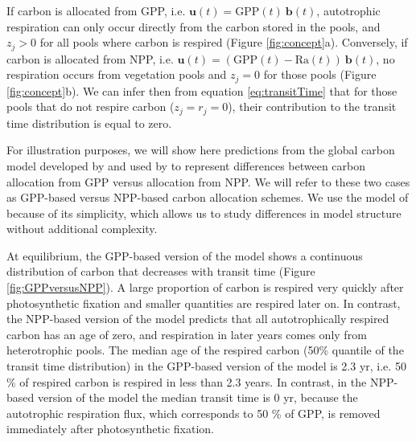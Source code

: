 \documentclass[bg, manuscript]{copernicus}
\begin{document}
 If carbon is allocated from GPP, i.e. $\bm{u}(t) = \mathrm{GPP}(t) \ \bm{b}(t) $, autotrophic respiration can only occur directly from the carbon stored in the pools, and $z_j > 0$ for all pools where carbon is respired (Figure \ref{fig:concept}a). Conversely, if carbon is allocated from NPP, i.e. $\bm{u}(t) = (\mathrm{GPP}(t) - \mathrm{Ra}(t)) \ \bm{b}(t)$, no respiration occurs from vegetation pools and $z_j = 0$ for those pools (Figure \ref{fig:concept}b). We can infer then from equation \eqref{eq:transitTime} that for those pools that do not respire carbon ($z_j = r_j = 0$), their contribution to the transit time distribution is equal to zero.

For illustration purposes, we will show here predictions from the global carbon model developed by \citet{Emanuel1981} and used by \citet{Thompson1999} to represent differences between carbon allocation from GPP versus allocation from NPP. We will refer to these two cases as GPP-based versus NPP-based carbon allocation schemes. We use the model of \citet{Emanuel1981} because of its simplicity, which allows us to study differences in model structure without additional complexity.

At equilibrium, the GPP-based version of the model shows a continuous distribution of carbon that decreases with transit time (Figure \ref{fig:GPPversusNPP}). A large proportion of carbon is respired very quickly after photosynthetic fixation and smaller quantities are respired later on. In contrast, the NPP-based version of the model predicts that all autotrophically respired carbon has an age of zero, and respiration in later years comes only from heterotrophic pools. The median age of the respired carbon (50\% quantile of the transit time distribution) in the GPP-based version of the model is 2.3 yr, i.e. 50 \% of respired carbon is respired in less than 2.3 years. In contrast, in the NPP-based version of the model the median transit time is 0 yr, because the autotrophic respiration flux, which corresponds to 50 \% of GPP, is removed immediately after photosynthetic fixation. 
\end{document}
